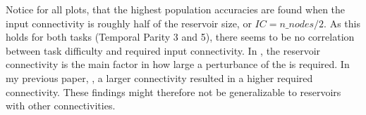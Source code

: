 Notice for all plots, that the highest population accuracies are found when the input connectivity is roughly half of the reservoir size, or $IC=n\_nodes/2$.
As this holds for both tasks (Temporal Parity 3 and 5), there seems to be no correlation between task difficulty and required input connectivity.
In , the reservoir connectivity is the main factor in how large a perturbance of the is required.
In my previous paper, , a larger connectivity resulted in a higher required connectivity.
These findings might therefore not be generalizable to reservoirs with other connectivities.
